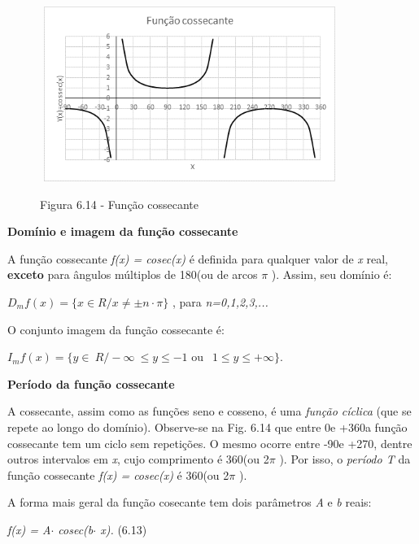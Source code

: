 \begin{figure}[H]
    \begin{Center}
        \includegraphics[width=3.83in,height=2.24in]{capitulos/trigonometria_e_funcoes_trigonometricas/media/image43.png}

        Figura 6.14  - Função cossecante
    \end{Center}
\end{figure}

\textbf{Domínio e imagem da função cossecante}

A função cossecante \textit{f(x) = cosec(x) }é definida para qualquer valor de \textit{x} real, \textbf{exceto} para ângulos múltiplos de 180\degree  (ou de arcos \textit{$ \pi $ }). Assim, seu domínio é:

  \( D_{m}f \left( x \right) = \{ x \in  R / x \neq  \pm n \cdot  \pi  \}  \) , para \textit{n=0,1,2,3,...}

O conjunto imagem da função cossecante é:

  $I_{m}f \left( x \right) = \{ y \in ~R /  - \infty ~ \leq  y  \leq  -1$  ou $~~ 1  \leq  y  \leq  +\infty \}$.

\textbf{Período da função cossecante}

A cossecante, assim como as funções seno e cosseno, é uma \textit{função cíclica} (que se repete ao longo do domínio). Observe-se na Fig. 6.14 que entre 0\degree  e +360\degree a função cossecante tem um ciclo sem repetições. O mesmo ocorre entre -90\degree e +270\degree, dentre outros intervalos em \textit{x}, cujo comprimento é 360\degree (ou 2$ \pi $ ). Por isso, o \textit{período T} da função cossecante  \textit{f(x) = cosec(x) } é 360\degree (ou  2$ \pi $ ).

A forma mais geral da função cosecante tem dois parâmetros \textit{A }e\textit{ b} reais:

\textit{f(x) = A$ \cdot $ cosec(b$ \cdot $ x).  \tab \tab \tab \tab \tab   }(6.13)


